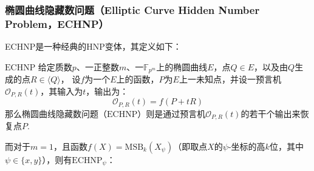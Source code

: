 \documentclass{book}
\numberwithin{equation}{subsubsection}
\begin{document}
\subsubsection{椭圆曲线隐藏数问题（Elliptic Curve Hidden Number Problem，ECHNP）}
ECHNP是一种经典的HNP变体，其定义如下：

\begin{concept}{$\text{ECHNP}$}
    给定质数$p$、一正整数$m$、一$\mathbb{F}_{p^m}$上的椭圆曲线$E$，点$Q\in{E}$，以及由$Q$生成的点$R\in{\langle Q\rangle}$，
    设$f$为一个$E$上的函数，$P$为$E$上一未知点，并设一预言机$\mathcal{O}_{P,R}(t)$，其输入为$t$，输出为：
    \begin{equation}
        \mathcal{O}_{P,R}(t)=f(P+tR)
        \nonumber
    \end{equation}
    那么椭圆曲线隐藏数问题（$\text{ECHNP}$）则是通过预言机$\mathcal{O}_{P,R}(t)$的若干个输出来恢复点$P$.\par
\end{concept}

而对于$m=1$，且函数$f(X)=\text{MSB}_k(X_{\psi})$（即取点$X$的$\psi$-坐标的高$k$位，其中$\psi\in\{x,y\}$），则有$\text{ECHNP}_{\psi}$：\par
\end{document}
